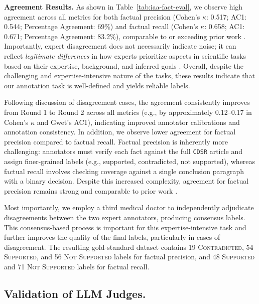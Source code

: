 \documentclass{article}
\newcommand{\xhdr}[1]{%
  \noindent\textbf{#1.}
}
\begin{document}
\xhdr{Agreement Results} As shown in Table~\ref{tab:iaa-fact-eval}, we observe high agreement across all metrics for both factual precision (Cohen's $\kappa$: 0.517; AC1: 0.544; Percentage Agreement: 69\%) and factual recall (Cohen's $\kappa$: 0.658; AC1: 0.671; Percentage Agreement: 83.2\%), comparable to or exceeding prior work \cite{cheng2025facts, liu-etal-2025-verifact, min-etal-2023-factscore}. Importantly, expert disagreement does not necessarily indicate noise; it can reflect \textit{legitimate differences} in how experts prioritize aspects in scientific tasks based on their expertise, background, and inferred goals \cite{hwang2026deepresearchshallowevaluation}. Overall, despite the challenging and expertise-intensive nature of the tasks, these results indicate that our annotation task is well-defined and yields reliable labels.

Following discussion of disagreement cases, the agreement consistently improves from Round 1 to Round 2 across all metrics (e.g., by approximately 0.12--0.17 in Cohen's $\kappa$ and Gwet's AC1), indicating improved annotator calibrations and annotation consistency. In addition, we observe lower agreement for factual precision compared to factual recall. Factual precision is inherently more challenging: annotators must verify each fact against the full \texttt{CDSR} article and assign finer-grained labels (e.g., supported, contradicted, not supported), whereas factual recall involves checking coverage against a single conclusion paragraph with a binary decision. Despite this increased complexity, agreement for factual precision remains strong and comparable to prior work \cite{cheng2025facts, liu-etal-2025-verifact, min-etal-2023-factscore}.

Most importantly, we employ a third medical doctor to independently adjudicate disagreements between the two expert annotators, producing consensus labels. This consensus-based process is important for this expertise-intensive task and further improves the quality of the final labels, particularly in cases of disagreement. The resulting gold-standard dataset contains 19 \textsc{Contradicted}, 54 \textsc{Supported}, and 56 \textsc{Not Supported} labels for factual precision, and 48 \textsc{Supported} and 71 \textsc{Not Supported} labels for factual recall.


\subsection{Validation of LLM Judges.}\label{appendix:fact-eval-llm}
\end{document}
